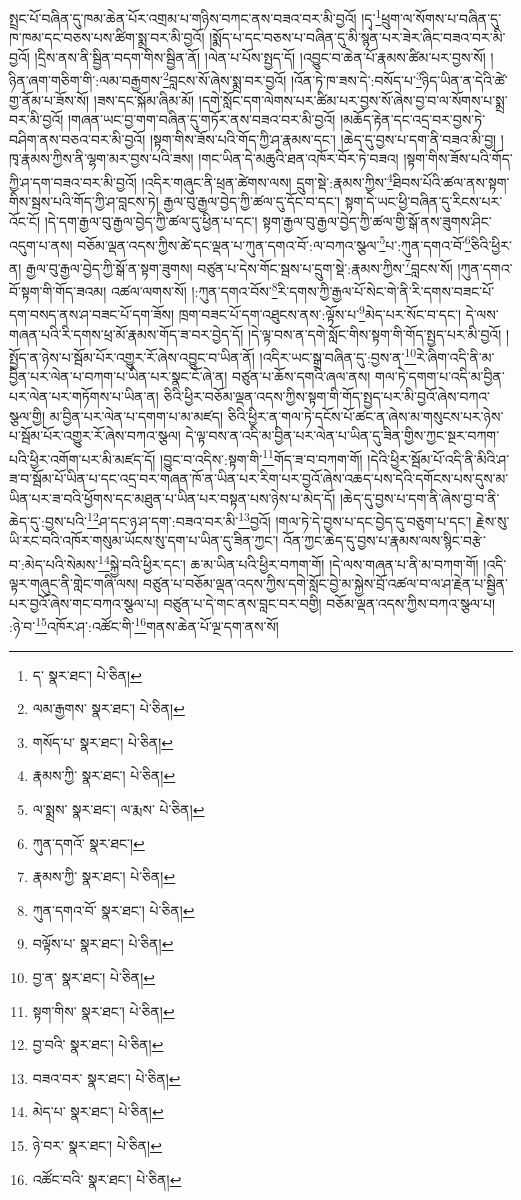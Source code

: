སྤྲང་པོ་བཞིན་དུ་ཁམ་ཆེན་པོར་འགྲམ་པ་གཉིས་བཀང་ནས་བཟའ་བར་མི་བྱའོ། །དྭ་\footnote{ད་  སྣར་ཐང་།  པེ་ཅིན། }ཕྲུག་ལ་སོགས་པ་བཞིན་དུ་ཁ་ཁམ་དང་བཅས་པས་ཚིག་སྨྲ་བར་མི་བྱའོ། །སྨོད་པ་དང་བཅས་པ་བཞིན་དུ་མི་སྙན་པར་ཟེར་ཞིང་བཟའ་བར་མི་བྱའོ། །དྲིས་ནས་ནི་སྦྱིན་བདག་གིས་སྦྱིན་ནོ། །ལེན་པ་པོས་སྤྱད་དོ། །འབྱུང་བ་ཆེན་པོ་རྣམས་ཚིམ་པར་བྱས་སོ། །ཉིན་ཞག་གཅིག་གི་:ལམ་བརྒྱགས་\footnote{ལམ་རྒྱགས་  སྣར་ཐང་།  པེ་ཅིན། }བླངས་སོ་ཞེས་སྨྲ་བར་བྱའོ། །འོན་ཏེ་ཁ་ཟས་དེ་:བསོད་པ་\footnote{གསོད་པ་  སྣར་ཐང་།  པེ་ཅིན། }ཉིད་ཡིན་ན་དེའི་ཚེ་གྱ་ནོམ་པ་ཟོས་སོ། །ཟས་དང་སྐོམ་ཞིམ་མོ། །དགེ་སློང་དག་ལེགས་པར་ཚིམ་པར་བྱས་སོ་ཞེས་བྱ་བ་ལ་སོགས་པ་སྨྲ་བར་མི་བྱའོ། །གཞན་ཡང་བྱ་གག་བཞིན་དུ་གཏོར་ནས་བཟའ་བར་མི་བྱའོ། །མཆོད་རྟེན་དང་འདྲ་བར་བྱས་ཏེ་བཤིག་ནས་བཅའ་བར་མི་བྱའོ། །སྟག་གིས་ཟོས་པའི་གོད་ཀྱི་ཤ་རྣམས་དང་། །ཆེད་དུ་བྱས་པ་དག་ནི་བཟའ་མི་བྱ། །ཁྭ་རྣམས་ཀྱིས་ནི་ལྷག་མར་བྱས་པའི་ཟས། །གང་ཡིན་དེ་མཆུའི་ཐན་འཁོར་བོར་ཏེ་བཟའ། །སྟག་གིས་ཟོས་པའི་གོད་ཀྱི་ཤ་དག་བཟའ་བར་མི་བྱའོ། །འདིར་གཞུང་ནི་ཕྲན་ཚེགས་ལས། དྲུག་སྡེ་:རྣམས་ཀྱིས་\footnote{རྣམས་ཀྱི་  སྣར་ཐང་།  པེ་ཅིན། }ཐིབས་པོའི་ཚལ་ནས་སྟག་གིས་སྦས་པའི་གོད་ཀྱི་ཤ་བླངས་ཏེ། རྒྱལ་བུ་རྒྱལ་བྱེད་ཀྱི་ཚལ་དུ་དོང་བ་དང་། སྟག་དེ་ཡང་ཕྱི་བཞིན་དུ་རིངས་པར་འོང་ངོ། །དེ་དག་རྒྱལ་བུ་རྒྱལ་བྱེད་ཀྱི་ཚལ་དུ་ཕྱིན་པ་དང་། སྟག་རྒྱལ་བུ་རྒྱལ་བྱེད་ཀྱི་ཚལ་གྱི་སྒོ་ནས་ཟུགས་ཤིང་འདུག་པ་ནས། བཅོམ་ལྡན་འདས་ཀྱིས་ཚེ་དང་ལྡན་པ་ཀུན་དགའ་བོ་:ལ་བཀའ་སྩལ་\footnote{ལ་སྨྲས་  སྣར་ཐང་། ལ་རྨས་  པེ་ཅིན། }པ་:ཀུན་དགའ་བོ་\footnote{ཀུན་དགའོ་  སྣར་ཐང་། }ཅིའི་ཕྱིར་ན། རྒྱལ་བུ་རྒྱལ་བྱེད་ཀྱི་སྒོ་ན་སྟག་ཟུགས། བཙུན་པ་དེས་གོང་སྦས་པ་དྲུག་སྡེ་:རྣམས་ཀྱིས་\footnote{རྣམས་ཀྱི་  སྣར་ཐང་།  པེ་ཅིན། }བླངས་སོ། །ཀུན་དགའ་བོ་སྟག་གི་གོད་ཟའམ། འཚལ་ལགས་སོ། །:ཀུན་དགའ་བོས་\footnote{ཀུན་དགའ་བོ་  སྣར་ཐང་།  པེ་ཅིན། }རི་དགས་ཀྱི་རྒྱལ་པོ་སེང་གེ་ནི་རི་དགས་བཟང་པོ་དག་བསད་ནས་ཤ་བཟང་པོ་དག་ཟོས། ཁྲག་བཟང་པོ་དག་འཐུངས་ནས་:ལྟོས་པ་\footnote{བལྟོས་པ་  སྣར་ཐང་།  པེ་ཅིན། }མེད་པར་སོང་བ་དང་། དེ་ལས་གཞན་པའི་རི་དགས་ཕྲ་མོ་རྣམས་གོད་ཟ་བར་བྱེད་དོ། །དེ་ལྟ་བས་ན་དགེ་སློང་གིས་སྟག་གི་གོད་སྤྱད་པར་མི་བྱའོ། །སྤྱོད་ན་ཉེས་པ་སྦོམ་པོར་འགྱུར་རོ་ཞེས་འབྱུང་བ་ཡིན་ནོ། །འདིར་ཡང་སྒྲ་བཞིན་དུ་:བྱས་ན་\footnote{བྱ་ན་  སྣར་ཐང་།  པེ་ཅིན། }རེ་ཞིག་འདི་ནི་མ་བྱིན་པར་ལེན་པ་བཀག་པ་ཡིན་པར་སྣང་ངོ་ཞེ་ན། བཙུན་པ་ཆོས་དགའི་ཞལ་ནས། གལ་ཏེ་དགག་པ་འདི་མ་བྱིན་པར་ལེན་པར་གཏོགས་པ་ཡིན་ན། ཅིའི་ཕྱིར་བཅོམ་ལྡན་འདས་ཀྱིས་སྟག་གི་གོད་སྤྱད་པར་མི་བྱའོ་ཞེས་བཀའ་སྩལ་གྱི། མ་བྱིན་པར་ལེན་པ་དགག་པ་མ་མཛད། ཅིའི་ཕྱིར་ན་གལ་ཏེ་དངོས་པོ་ཚང་ན་ཞེས་མ་གསུངས་པར་ཉེས་པ་སྦོམ་པོར་འགྱུར་རོ་ཞེས་བཀའ་སྩལ། དེ་ལྟ་བས་ན་འདི་མ་བྱིན་པར་ལེན་པ་ཡིན་དུ་ཟིན་གྱིས་ཀྱང་སྔར་བཀག་པའི་ཕྱིར་འགོག་པར་མི་མཛད་དོ། །བྱུང་བ་འདིས་:སྟག་གི་\footnote{སྟག་གིས་  སྣར་ཐང་།  པེ་ཅིན། }གོད་ཟ་བ་བཀག་གོ། །དེའི་ཕྱིར་སྦོམ་པོ་འདི་ནི་མིའི་ཤ་ཟ་བ་སྦོམ་པོ་ཡིན་པ་དང་འདྲ་བར་གཞན་ཁོ་ན་ཡིན་པར་རིག་པར་བྱའོ་ཞེས་འཆད་པས་དེའི་དགོངས་པས་དུས་མ་ཡིན་པར་ཟ་བའི་ཕྱོགས་དང་མཐུན་པ་ཡིན་པར་བསྟན་པས་ཉེས་པ་མེད་དོ། །ཆེད་དུ་བྱས་པ་དག་ནི་ཞེས་བྱ་བ་ནི་ཆེད་དུ་:བྱས་པའི་\footnote{བྱ་བའི་  སྣར་ཐང་།  པེ་ཅིན། }ཤ་དང་ཉ་ཤ་དག་:བཟའ་བར་མི་\footnote{བཟའ་བར་  སྣར་ཐང་།  པེ་ཅིན། }བྱའོ། །གལ་ཏེ་དེ་བྱས་པ་དང་བྱེད་དུ་བཅུག་པ་དང་། རྗེས་སུ་ཡི་རང་བའི་འཁོར་གསུམ་ཡོངས་སུ་དག་པ་ཡིན་དུ་ཟིན་ཀྱང་། འོན་ཀྱང་ཆེད་དུ་བྱས་པ་རྣམས་ལས་སྙིང་བརྩེ་བ་:མེད་པའི་སེམས་\footnote{མེད་པ་  སྣར་ཐང་།  པེ་ཅིན། }སྐྱེ་བའི་ཕྱིར་དང་། ཆ་མ་ཡིན་པའི་ཕྱིར་བཀག་གོ། །དེ་ལས་གཞན་པ་ནི་མ་བཀག་གོ། །འདི་ལྟར་གཞུང་ནི་གླེང་གཞི་ལས། བཙུན་པ་བཅོམ་ལྡན་འདས་ཀྱིས་དགེ་སློང་བྱེ་མ་སྐྱེས་བྲོ་འཚལ་བ་ལ་ཤ་རྗེན་པ་སྦྱིན་པར་བྱའོ་ཞེས་གང་བཀའ་སྩལ་པ། བཙུན་པ་དེ་གང་ནས་བླང་བར་བགྱི། བཅོམ་ལྡན་འདས་ཀྱིས་བཀའ་སྩལ་པ། :ཉེ་བ་\footnote{ཉེ་བར་  སྣར་ཐང་།  པེ་ཅིན། }འཁོར་ཤ་:འཚོང་གི་\footnote{འཚོང་བའི་  སྣར་ཐང་།  པེ་ཅིན། }གནས་ཆེན་པོ་ལྔ་དག་ནས་སོ། 